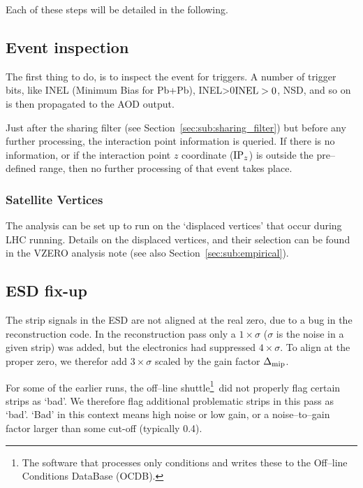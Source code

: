 \documentclass[compat,11pt]{alicenote}
\DeclareRobustCommand{\AlwaysText}[1]{\ifmmode\relax\text{#1}\else #1\fi}
\newcommand*\INEL{\AlwaysText{INEL}}
\newcommand*\NSD{\AlwaysText{NSD}}
\newcommand*\INELGT{\ifmmode\INEL>0\else$\INEL>0$\fi}
\let\INELONE\INELGT
\newcommand{\AOD}{\AlwaysText{AOD}}
\newcommand{\secref}[1]{Section~\ref{#1}}
\newcommand{\DeltaMip}{\ensuremath\Delta_{\text{mip}}}
\begin{document}
Each of these steps will be detailed in the following. 

\subsection{Event inspection}
\label{sec:sub:event_inspection}

The first thing to do, is to inspect the event for triggers.  A number
of trigger bits, like \INEL{} (Minimum Bias for Pb+Pb), \INELONE{},
\NSD{}, and so on is then propagated to the \AOD{} output.

Just after the sharing filter (see \secref{sec:sub:sharing_filter})
but before any further processing, the interaction point information
is queried.  If there is no information, or if the interaction point
$z$ coordinate ($\IPz$) is outside the pre--defined range, then no
further processing of that event takes place.

\subsubsection{Satellite Vertices}
\label{sec:sub:sub:dispvtx}

The analysis can be set up to run on the `displaced vertices' that
occur during LHC \PbPbCol{} running. Details on the displaced
vertices, and their selection can be found in the VZERO analysis note
\cite{maxime} (see also \secref{sec:sub:empirical}).

\subsection{ESD fix-up}
\label{sec:sub:fixer} 

The \FMD{} strip signals in the ESD are not aligned at the real zero,
due to a bug in the reconstruction code.  In the reconstruction pass
only a $1\times\sigma$ ($\sigma$ is the noise in a given strip) was
added, but the electronics had suppressed $4\times\sigma$.  To align
at the proper zero, we therefor add $3\times\sigma$ scaled by the gain
factor $\DeltaMip$.

For some of the earlier runs, the off--line shuttle\footnote{The
  software that processes only conditions and writes these to the
  Off--line Conditions DataBase (OCDB).}\ did not properly flag certain
strips as `bad'.  We therefore flag additional problematic strips in
this pass as `bad'.  `Bad' in this context means high noise or low
gain, or a noise--to--gain factor larger than some cut-off (typically
0.4). 
\end{document}
